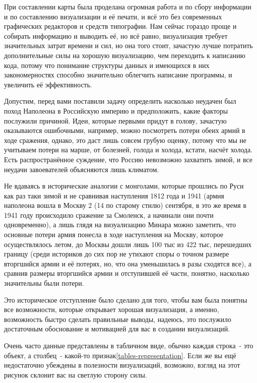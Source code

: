 При составлении карты была проделана огромная работа и по сбору информации и по составлению визуализации и её печати, и всё это без современных графических редакторов и средств типографии. Нам сейчас гораздо проще и собирать информацию и выводить её, но всё равно, визуализация требует значительных затрат времени и сил, но она того стоит, зачастую лучше потратить дополнительные силы на хорошую визуализацию, чем переходить к написанию кода, потому что понимание структуры данных и имеющихся в них закономерностях способно значительно облегчить написание программы, и увеличить её эффективность.

Допустим, перед вами поставили задачу определить насколько неудачен был поход Наполеона в Российскую империю и предположить, какие факторы послужили причиной. Идеи, которые первыми придут в голову, зачастую оказываются ошибочными, например, можно посмотреть потери обеих армий в ходе сражения, однако, это даст лишь совсем грубую оценку, потому что мы не учитываем потери на марше, от болезней, голода и холода, кстати, насчёт холода. Есть распространённое суждение, что Россию невозможно захватить зимой, и все неудачи завоевателей объясняются лишь климатом. 

Не вдаваясь в исторические аналогии с монголами, которые прошлись по Руси как раз таки зимой и не сравнивая наступления 1812 года и 1941 (армия наполеона вошла в Москву 2 (14 по старому стилю) сентября, в это же время в 1941 году происходило сражение за Смоленск, а начинали они почти одновременно), а лишь глядя на визуализацию Минара можно заметить, что основные потери армия понесла в ходе наступления на Москву, которое осуществлялось летом, до Москвы дошли лишь 100 тыс из 422 тыс, перешедших границу (среди историков до сих пор не утихают споры о точном размере вторгшийся армии и её потерях, но, что она уменьшилась в разы сходятся все), а сравнив размеры вторгшийся армии и отступившей её части, понятно, насколько значительны были потери.

Это историческое отступление было сделано для того, чтобы вам была понятны все возможности, которые открывает хорошая визуализация, а именно, возможность быстро сделать правильные выводы, надеюсь, это послужило достаточным обоснование и мотивацией для вас в создании визуализаций.

Очень часто данные представлены в табличном виде, обычно каждая строка~\-- это объект, а столбец~\-- какой-то признак\autoref{tables-representation}. Если же вы ещё недостаточно убеждены в полезности визуализаций, возможно, взгляд на этот рисунок склонит вас на светлую сторону силы.

